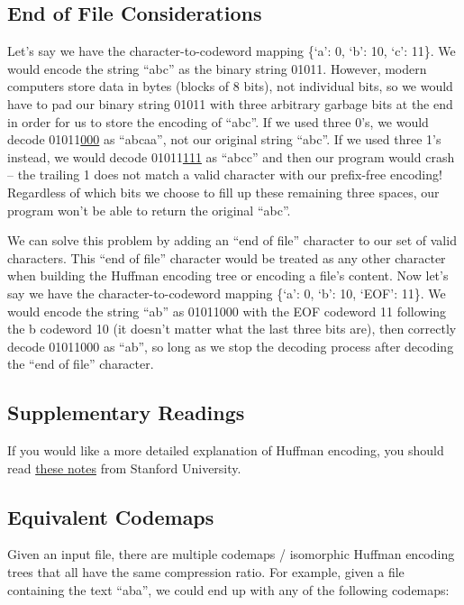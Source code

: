 \documentclass[11pt]{article}
\begin{document}
\subsection*{End of File Considerations}

Let's say we have the character-to-codeword mapping \{`a': 0, `b': 10, `c': 11\}. We would encode the string ``abc'' as the binary string 01011. However, modern computers store data in bytes (blocks of 8 bits), not individual bits, so we would have to pad our binary string 01011 with three arbitrary garbage bits at the end in order for us to store the encoding of ``abc''. If we used three 0's, we would decode 01011\underline{000} as ``abcaa'', not our original string ``abc''. If we used three 1's instead, we would decode 01011\underline{111} as ``abcc'' and then our program would crash -- the trailing 1 does not match a valid character with our prefix-free encoding! Regardless of which bits we choose to fill up these remaining three spaces, our program won't be able to return the original ``abc''.

We can solve this problem by adding an ``end of file'' character to our set of valid characters. This ``end of file'' character would be treated as any other character when building the Huffman encoding tree or encoding a file's content. Now let's say we have the character-to-codeword mapping \{`a': 0, `b': 10, `EOF': 11\}. We would encode the string ``ab'' as 01011000 with the EOF codeword 11 following the b codeword 10 (it doesn't matter what the last three bits are), then correctly decode 01011000 as ``ab'', so long as we stop the decoding process after decoding the ``end of file'' character.

\subsection*{Supplementary Readings}

If you would like a more detailed explanation of Huffman encoding, you should read \href{http://inst.eecs.berkeley.edu/~cs61bl/code/proj2/HuffmanEncoding.pdf}{\color{blue}these notes} from Stanford University.

\newpage

\subsection*{Equivalent Codemaps}
Given an input file, there are multiple codemaps / isomorphic Huffman encoding trees that all have the same compression ratio. For example, given a file containing the text ``aba'', we could end up with any of the following codemaps:\\
\end{document}
